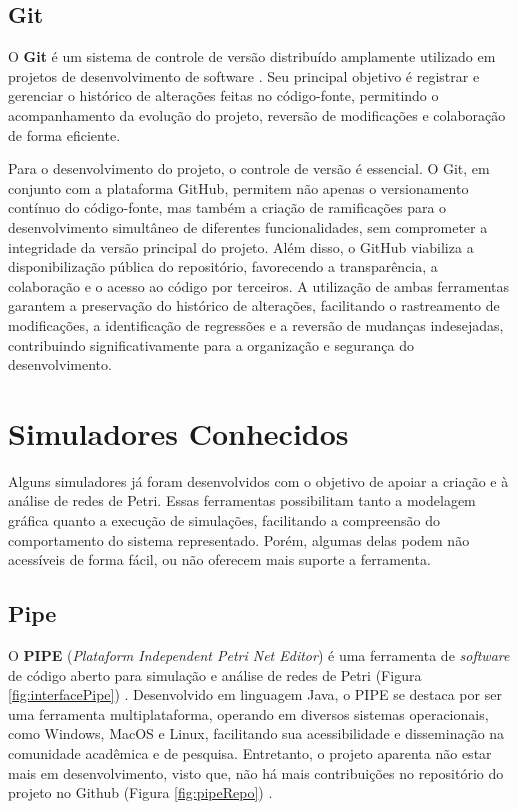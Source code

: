 \documentclass[
	12pt,				%
	openright,			%
	oneside,			%
	a4paper,			%
	english,			%
	brazil				%
	]{abntex2}
\theoremstyle{doispontos}
\begin{document}
\subsection{Git} \label{cap:git}

O \textbf{Git} é um sistema de controle de versão distribuído amplamente utilizado em projetos de desenvolvimento de software \textcite{git_docs}. Seu principal objetivo é registrar e gerenciar o histórico de alterações feitas no código-fonte, permitindo o acompanhamento da evolução do projeto, reversão de modificações e colaboração de forma eficiente.

Para o desenvolvimento do projeto, o controle de versão é essencial. O Git, em conjunto com a plataforma GitHub, permitem não apenas o versionamento contínuo do código-fonte, mas também a criação de ramificações para o desenvolvimento simultâneo de diferentes funcionalidades, sem comprometer a integridade da versão principal do projeto. Além disso, o GitHub viabiliza a disponibilização pública do repositório, favorecendo a transparência, a colaboração e o acesso ao código por terceiros. A utilização de ambas ferramentas garantem a preservação do histórico de alterações, facilitando o rastreamento de modificações, a identificação de regressões e a reversão de mudanças indesejadas, contribuindo significativamente para a organização e segurança do desenvolvimento.

\section{Simuladores Conhecidos}

Alguns simuladores já foram desenvolvidos com o objetivo de apoiar a criação e à análise de redes de Petri. Essas ferramentas possibilitam tanto a modelagem gráfica quanto a execução de simulações, facilitando a compreensão do comportamento do sistema representado. Porém, algumas delas podem não acessíveis de forma fácil, ou não oferecem mais suporte a ferramenta.

\subsection{Pipe}

O \textbf{PIPE} (\textit{Plataform Independent Petri Net Editor}) é uma ferramenta de \textit{software} de código aberto para simulação e análise de redes de Petri (Figura \ref{fig:interfacePipe}) \textcite{Dingle2009PIPE2}. Desenvolvido em linguagem Java, o PIPE se destaca por ser uma ferramenta multiplataforma, operando  em diversos sistemas operacionais, como Windows, MacOS e Linux, facilitando sua acessibilidade e disseminação na comunidade acadêmica e de pesquisa. Entretanto, o projeto aparenta não estar mais em desenvolvimento, visto que, não há mais contribuições no repositório do projeto no Github (Figura \ref{fig:pipeRepo}) \textcite{PIPEGitHub}. 
\end{document}
